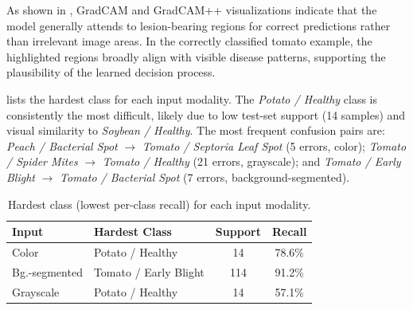 \documentclass[10pt,twocolumn,letterpaper]{article}
\begin{document}
As shown in , GradCAM and GradCAM++ visualizations indicate that the model generally attends to lesion-bearing regions for correct predictions rather than irrelevant image areas. In the correctly classified tomato example, the highlighted regions broadly align with visible disease patterns, supporting the plausibility of the learned decision process.

 lists the hardest class for each input modality. The \textit{Potato / Healthy} class is consistently the most difficult, likely due to low test-set support (14 samples) and visual similarity to \textit{Soybean / Healthy}. The most frequent confusion pairs are: \textit{Peach / Bacterial Spot} $\rightarrow$ \textit{Tomato / Septoria Leaf Spot} (5 errors, color); \textit{Tomato / Spider Mites} $\rightarrow$ \textit{Tomato / Healthy} (21 errors, grayscale); and \textit{Tomato / Early Blight} $\rightarrow$ \textit{Tomato / Bacterial Spot} (7 errors, background-segmented).

\begin{table}[t]
\centering
\small
\begin{tabular}{llcc}
\toprule
Input & Hardest Class & Support & Recall \\
\midrule
Color & Potato / Healthy & 14 & 78.6\% \\
Bg.-segmented & Tomato / Early Blight & 114 & 91.2\% \\
Grayscale & Potato / Healthy & 14 & 57.1\% \\
\bottomrule
\end{tabular}
\caption{Hardest class (lowest per-class recall) for each input modality.}
\label{tab:hardest-classes}
\end{table}
\end{document}
